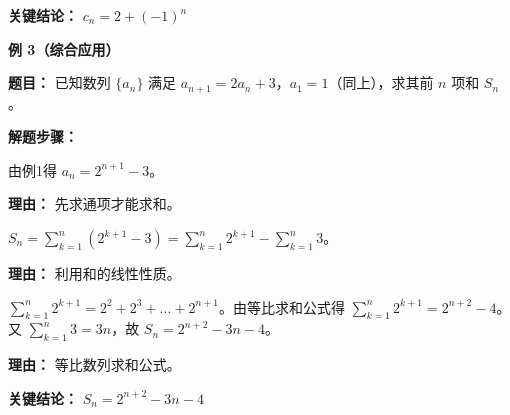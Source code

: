 \begin{examplebox}
	\textbf{\textcolor{CExample}{关键结论：}}
	\textbf{$c_n=2+(-1)^{n}$}

	\medskip
	\textbf{\textcolor{CExample}{例 3（综合应用）}}

	\textbf{\textcolor{CExample}{题目：}}
	已知数列 $\{a_n\}$ 满足 $a_{n+1}=2a_n+3$，$a_1=1$（同上），求其前 $n$ 项和 $S_n$。

	\textbf{\textcolor{CExample}{解题步骤：}}
	\begin{description}[style=nextline, leftmargin=2.8em, labelsep=0.5em, itemsep=0.45em]
		\item[\textbf{第一步（求通项）：}] 由例1得 $a_n=2^{n+1}-3$。
			\par\textbf{理由：}
			先求通项才能求和。
		\item[\textbf{第二步（拆分求和）：}] $S_n = \sum_{k=1}^{n}(2^{k+1}-3) = \sum_{k=1}^{n}2^{k+1} - \sum_{k=1}^{n}3$。
			\par\textbf{理由：}
			利用和的线性性质。
		\item[\textbf{第三步（计算求和）：}] $\sum_{k=1}^{n}2^{k+1}=2^{2}+2^{3}+\dots+2^{n+1}$。由等比求和公式得 $\sum_{k=1}^{n}2^{k+1}=2^{n+2}-4$。又 $\sum_{k=1}^{n}3=3n$，故 $S_n = 2^{n+2} - 3n - 4$。
			\par\textbf{理由：}
			等比数列求和公式。
	\end{description}

	\textbf{\textcolor{CExample}{关键结论：}}
	\textbf{$S_n=2^{n+2}-3n-4$}
\end{examplebox}
